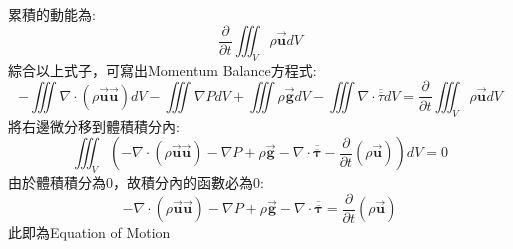 \documentclass[../main.tex]{subfiles}
\begin{document}
\begin{itemize}
    累積的動能為:
    \begin{equation}
      \frac{\partial }{\partial t} \iiint_{V} \rho \vec {\bm u} dV
    \end{equation}
    綜合以上式子，可寫出Momentum Balance方程式:
    \begin{equation}
      -\iiint \nabla \cdot (\rho \vec {\bm u} \vec {\bm u}) dV - \iiint \nabla P dV + \iiint \rho \vec {\bm g} dV - \iiint \nabla \cdot \overline{\overline\tau} dV
      = \frac{\partial }{\partial t} \iiint_{V} \rho \vec {\bm u} dV
    \end{equation}
    將右邊微分移到體積積分內:
    \begin{equation}
      \iiint_{V} \left(
        -\nabla \cdot (\rho \vec {\bm u} \vec {\bm u}) - \nabla P + \rho \vec {\bm g} - \nabla \cdot \overline{\overline{\bm \tau}}
        - \frac{\partial }{\partial t}(\rho \vec {\bm u})
      \right) dV = 0
    \end{equation}
    由於體積積分為0，故積分內的函數必為0:
    \begin{equation}
      -\nabla \cdot (\rho \vec {\bm u} \vec {\bm u}) - \nabla P + \rho \vec {\bm g} - \nabla \cdot \overline{\overline{\bm \tau}}
      = \frac{\partial }{\partial t}(\rho \vec {\bm u})
    \end{equation}
    此即為Equation of Motion
\end{itemize}
\end{document}

